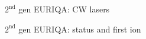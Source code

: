 \documentclass{beamer}
\begin{document}

\begin{frame}{$2^{\text{nd}}$ gen EURIQA: CW lasers}
  \begin{center}
    \begin{tikzpicture}
    \end{tikzpicture}
  \end{center}
\end{frame}



\begin{frame}{$2^{\text{nd}}$ gen EURIQA: status and first ion}
  \begin{center}
    \begin{tikzpicture}
    \end{tikzpicture}
  \end{center}
\end{frame}

\begin{frame}{}
\end{frame}
\end{document}
